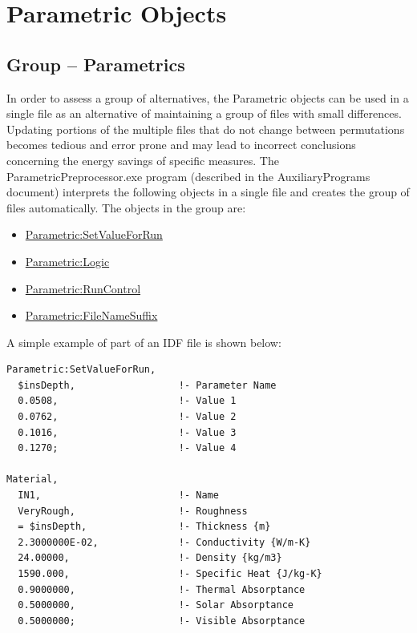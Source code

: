 \chapter{Parametric Objects}\label{parametric-objects}

\section{Group -- Parametrics}\label{group-parametrics}

In order to assess a group of alternatives, the Parametric objects can be used in a single file as an alternative of maintaining a group of files with small differences. Updating portions of the multiple files that do not change between permutations becomes tedious and error prone and may lead to incorrect conclusions concerning the energy savings of specific measures. The ParametricPreprocessor.exe program (described in the AuxiliaryPrograms document) interprets the following objects in a single file and creates the group of files automatically. The objects in the group are:

\begin{itemize}
\item
  \hyperref[parametricsetvalueforrun]{Parametric:SetValueForRun}
\item
  \hyperref[parametriclogic]{Parametric:Logic}
\item
  \hyperref[parametricruncontrol]{Parametric:RunControl}
\item
  \hyperref[parametricfilenamesuffix]{Parametric:FileNameSuffix}
\end{itemize}

A simple example of part of an IDF file is shown below:

\begin{lstlisting}
Parametric:SetValueForRun,
  $insDepth,                  !- Parameter Name
  0.0508,                     !- Value 1
  0.0762,                     !- Value 2
  0.1016,                     !- Value 3
  0.1270;                     !- Value 4

Material,
  IN1,                        !- Name
  VeryRough,                  !- Roughness
  = $insDepth,                !- Thickness {m}
  2.3000000E-02,              !- Conductivity {W/m-K}
  24.00000,                   !- Density {kg/m3}
  1590.000,                   !- Specific Heat {J/kg-K}
  0.9000000,                  !- Thermal Absorptance
  0.5000000,                  !- Solar Absorptance
  0.5000000;                  !- Visible Absorptance
\end{lstlisting}

